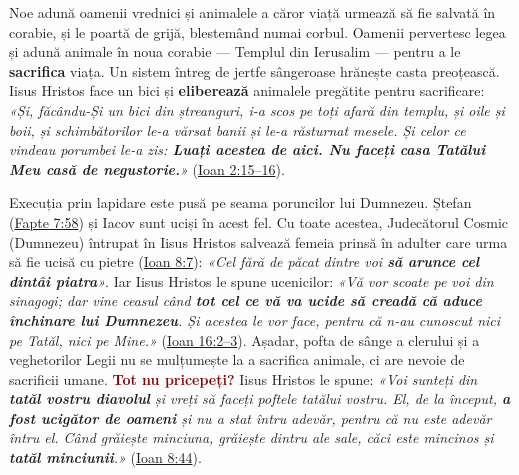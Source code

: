 \documentclass[12pt,a4paper,twoside,openany]{book}
\begin{document}
Noe adună oamenii vrednici și animalele a căror viață urmează să fie salvată în corabie, și le poartă de grijă, blestemând numai corbul. Oamenii pervertesc legea și adună animale în noua corabie — Templul din Ierusalim — pentru a le \textbf{sacrifica} viața. Un sistem întreg de jertfe sângeroase hrănește casta preoțească. Iisus Hristos face un bici și \textbf{eliberează} animalele pregătite pentru sacrificare: \textit{«Și, făcându-Și un bici din ștreanguri, i-a scos pe toți afară din templu, și oile și boii, și schimbătorilor le-a vărsat banii și le-a răsturnat mesele. Și celor ce vindeau porumbei le-a zis: \textbf{Luați acestea de aici. Nu faceți casa Tatălui Meu casă de negustorie.}»} (\href{https://bibliaortodoxa.ro/carte.php?id=35\&cap=2\#15}{Ioan 2:15–16}).

Execuția prin lapidare este pusă pe seama poruncilor lui Dumnezeu. Ștefan (\href{https://bibliaortodoxa.ro/carte.php?id=26\&cap=7\#58}{Fapte 7:58}) și Iacov sunt uciși în acest fel. Cu toate acestea, Judecătorul Cosmic (Dumnezeu) întrupat în Iisus Hristos salvează femeia prinsă în adulter care urma să fie ucisă cu pietre (\href{https://bibliaortodoxa.ro/carte.php?id=35\&cap=8\#7}{Ioan 8:7}): \textit{«Cel fără de păcat dintre voi \textbf{să arunce cel dintâi piatra}»}. Iar Iisus Hristos le spune ucenicilor: \textit{«Vă vor scoate pe voi din sinagogi; dar vine ceasul când \textbf{tot cel ce vă va ucide să creadă că aduce închinare lui Dumnezeu}. Și acestea le vor face, pentru că n-au cunoscut nici pe Tatăl, nici pe Mine.»} (\href{https://bibliaortodoxa.ro/carte.php?id=35\&cap=16\#2}{Ioan 16:2–3}). Așadar, pofta de sânge a clerului și a veghetorilor Legii nu se mulțumește la a sacrifica animale, ci are nevoie de sacrificii umane. \textcolor{darkred}{\textbf{Tot nu pricepeți?}} Iisus Hristos le spune: \textit{«Voi sunteți din \textbf{tatăl vostru diavolul} și vreți să faceți poftele tatălui vostru. El, de la început, \textbf{a fost ucigător de oameni} și nu a stat întru adevăr, pentru că nu este adevăr întru el. Când grăiește minciuna, grăiește dintru ale sale, căci este mincinos și \textbf{tatăl minciunii}.»} (\href{https://bibliaortodoxa.ro/carte.php?id=35\&cap=8\#44}{Ioan 8:44}).
\end{document}
